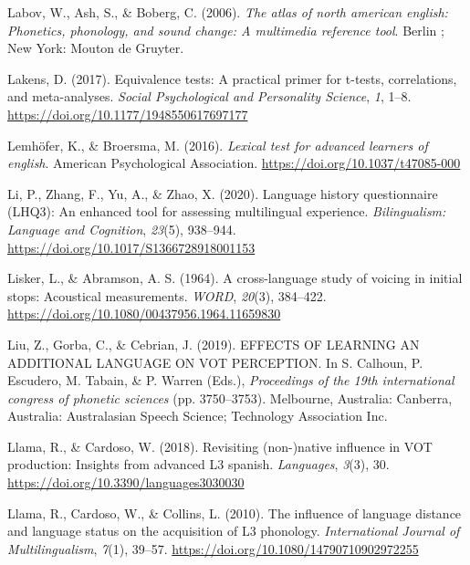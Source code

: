 \documentclass[
  man]{apa6}
\newlength{\cslhangindent}
\newlength{\cslentryspacingunit} %
\newenvironment{CSLReferences}[2] %
 {%
  \setlength{\parindent}{0pt}
  \ifodd #1
  \let\oldpar\par
  \def\par{\hangindent=\cslhangindent\oldpar}
  \fi
  \setlength{\parskip}{#2\cslentryspacingunit}
 }%
 {}
\begin{document}
\begin{CSLReferences}{1}{0}
\leavevmode{}%
Labov, W., Ash, S., \& Boberg, C. (2006). \emph{The atlas of north american english: Phonetics, phonology, and sound change: A multimedia reference tool}. Berlin ; New York: Mouton de Gruyter.

\leavevmode{}%
Lakens, D. (2017). Equivalence tests: A practical primer for t-tests, correlations, and meta-analyses. \emph{Social Psychological and Personality Science}, \emph{1}, 1--8. \url{https://doi.org/10.1177/1948550617697177}

\leavevmode{}%
Lemhöfer, K., \& Broersma, M. (2016). \emph{Lexical test for advanced learners of english}. American Psychological Association. \url{https://doi.org/10.1037/t47085-000}

\leavevmode{}%
Li, P., Zhang, F., Yu, A., \& Zhao, X. (2020). Language history questionnaire ({LHQ}3): An enhanced tool for assessing multilingual experience. \emph{Bilingualism: Language and Cognition}, \emph{23}(5), 938--944. \url{https://doi.org/10.1017/S1366728918001153}

\leavevmode{}%
Lisker, L., \& Abramson, A. S. (1964). A cross-language study of voicing in initial stops: Acoustical measurements. \emph{\emph{WORD}}, \emph{20}(3), 384--422. \url{https://doi.org/10.1080/00437956.1964.11659830}

\leavevmode{}%
Liu, Z., Gorba, C., \& Cebrian, J. (2019). {EFFECTS} {OF} {LEARNING} {AN} {ADDITIONAL} {LANGUAGE} {ON} {VOT} {PERCEPTION}. In S. Calhoun, P. Escudero, M. Tabain, \& P. Warren (Eds.), \emph{Proceedings of the 19th international congress of phonetic sciences} (pp. 3750--3753). Melbourne, Australia: Canberra, Australia: Australasian Speech Science; Technology Association Inc.

\leavevmode{}%
Llama, R., \& Cardoso, W. (2018). Revisiting (non-)native influence in {VOT} production: Insights from advanced L3 spanish. \emph{Languages}, \emph{3}(3), 30. \url{https://doi.org/10.3390/languages3030030}

\leavevmode{}%
Llama, R., Cardoso, W., \& Collins, L. (2010). The influence of language distance and language status on the acquisition of L3 phonology. \emph{International Journal of Multilingualism}, \emph{7}(1), 39--57. \url{https://doi.org/10.1080/14790710902972255}


\end{CSLReferences}
\end{document}
